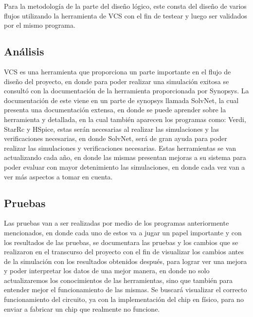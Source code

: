 

Para la metodología de la parte del diseño lógico, este consta del diseño de varios flujos utilizando la herramienta de VCS con el fin de testear y luego ser validados por el mismo programa.

\subsection*{Análisis}
VCS es una herramienta que proporciona un parte importante en el flujo de diseño del proyecto, en donde para poder realizar una simulación exitosa se consultó con la documentación de la herramienta proporcionada por Synopsys.
La documentación de este viene en un parte de synopsys llamada SolvNet, la cual presenta una documentación extensa, en donde se puede aprender sobre la herramienta y detallada, en la cual también aparecen los programas como: Verdi, StarRc y HSpice, estas serán necesarias al realizar las simulaciones y las verificaciones necesarias, en donde SolvNet, será de gran ayuda para poder realizar las simulaciones y verificaciones necesarias.
Estas herramientas se van actualizando cada año, en donde las mismas presentan mejoras a su sistema para poder evaluar con mayor detenimiento las simulaciones, en donde cada vez van a ver más aspectos a tomar en cuenta.


\subsection*{Pruebas}
Las pruebas van a ser realizadas por medio de los programas anteriormente mencionados, en donde cada uno de estos va a jugar un papel importante y con los resultados de las pruebas, se documentara las pruebas y los cambios que se realizaron en el transcurso del proyecto con el fin de  visualizar los cambios antes de la simulación con los resultados obtenidos después, para lograr ver una mejora y poder interpretar los datos de una mejor manera, en donde no solo actualizaremos los conocimientos de las herramientas, sino que también para entender mejor el funcionamiento de las mismas. 
Se buscará visualizar el correcto funcionamiento del circuito, ya con la implementación del chip en físico, para no enviar a fabricar un chip que realmente no funcione.
